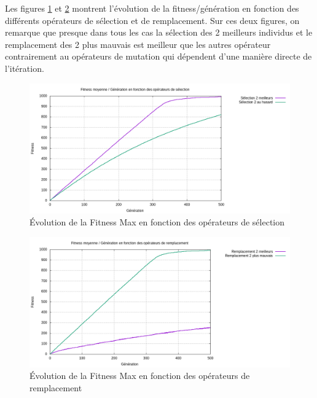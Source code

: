 \documentclass[12pt]{article}
\begin{document}
Les figures \ref{fitness_op_selection} et \ref{fitness_op_rempl} montrent l'évolution de la fitness/génération en fonction des différents opérateurs de sélection et de remplacement. Sur ces deux figures, on remarque que presque dans tous les cas la sélection des 2 meilleurs individus et le remplacement des 2 plus mauvais est meilleur que les autres opérateur contrairement au opérateurs de mutation qui dépendent d'une manière directe de l'itération. 

\begin{figure}[H]
		\begin{center}
			\includegraphics[scale=0.5]{img/fitness_op_selection.png}
			\caption{Évolution de la Fitness Max en fonction des opérateurs de sélection}
			\label{fitness_op_selection}
		\end{center}
\end{figure}

\begin{figure}[H]
		\begin{center}
			\includegraphics[scale=0.5]{img/fitness_op_rempl.png}
			\caption{Évolution de la Fitness Max en fonction des opérateurs de remplacement}
			\label{fitness_op_rempl}
		\end{center}
\end{figure}
\end{document}

